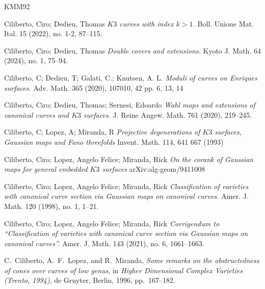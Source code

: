 \documentclass[11pt,twoside]{amsart}
\theoremstyle{plain}
\numberwithin{equation}{section}
\theoremstyle{definition}
\begin{document}
\begin{thebibliography}{KMM92}



Ciliberto, Ciro; Dedieu, Thomas
\emph{$K3$ curves with index $k>1$.}
Boll. Unione Mat. Ital. 15 (2022), no. 1-2, 87–115.

Ciliberto, Ciro; Dedieu, Thomas
\emph{Double covers and extensions.}
Kyoto J. Math. 64 (2024), no. 1, 75–94.


Ciliberto, C; Dedieu, T;  Galati, C.; Knutsen, A. L.  
\emph{Moduli of curves on Enriques surfaces.}
Adv. Math. 365 (2020), 107010, 42 pp. 6, 13, 14

Ciliberto, Ciro; Dedieu, Thomas; Sernesi, Edoardo
\emph{Wahl maps and extensions of canonical curves and $K3$ surfaces.}
J. Reine Angew. Math. 761 (2020), 219–245.

Ciliberto, C; Lopez, A; Miranda, R
\emph{Projective degenerations of $K3$ surfaces, Gaussian maps and Fano threefolds}
Invent. Math. 114, 641 667 (1993)

Ciliberto, Ciro; Lopez, Angelo Felice; Miranda, Rick
\emph{On the corank of Gaussian maps for general embedded $K3$ surfaces}
arXiv:alg-geom/9411008

Ciliberto, Ciro; Lopez, Angelo Felice; Miranda, Rick
\emph{Classification of varieties with canonical curve section via Gaussian maps on canonical curves.}
Amer. J. Math.   120 (1998), no. 1, 1–21.

Ciliberto, Ciro; Lopez, Angelo Felice; Miranda, Rick
\emph{Corrigendum to ``Classification of varieties with canonical curve section via Gaussian maps on canonical curves''.}
Amer. J. Math. 143 (2021), no. 6, 1661–1663.

C.~Ciliberto, A.~F.~Lopez, and R.~Miranda,
\newblock \emph{Some remarks on the obstructedness of cones over curves of low genus},
\newblock in \emph{Higher Dimensional Complex Varieties (Trento, 1994)},
de Gruyter, Berlin, 1996, pp.~167--182.


\end{thebibliography}
\end{document}
